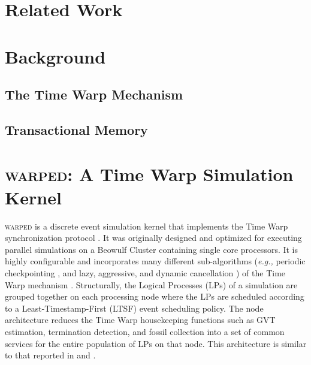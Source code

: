 \documentclass{sig-alternate}
\begin{document}
\section{Related Work}\label{related}


\section{Background}\label{background}

\subsection{The Time Warp Mechanism}


\subsection{Transactional Memory}



\section{\textsc{warped}: A Time Warp Simulation Kernel}\label{warped}




\textsc{warped} is a discrete event simulation kernel that implements the Time
Warp synchronization protocol \cite{martin-96}.  It was originally designed and
optimized for executing parallel simulations on a Beowulf Cluster containing
single core processors.  It is highly configurable and incorporates many
different sub-algorithms (\emph{e.g.,} periodic checkpointing
\cite{fujimoto-90}, and lazy, aggressive, and dynamic cancellation
\cite{rajan-95}) of the Time Warp mechanism \cite{fujimoto-90}.  Structurally,
the Logical Processes (LPs) of a simulation are grouped together on each
processing node where the LPs are scheduled according to a Least-Timestamp-First
(LTSF) event scheduling policy.  The node architecture reduces the Time Warp
housekeeping functions such as GVT estimation, termination detection, and fossil
collection into a set of common services for the entire population of LPs on
that node.  This architecture is similar to that reported in \cite{avril-95} and
\cite{ramanan-97}.
\end{document}
